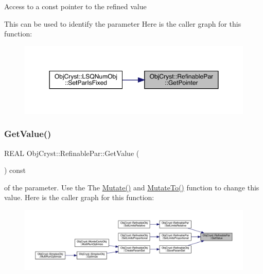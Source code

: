 Access to a const pointer to the refined value

This can be used to identify the parameter Here is the caller graph for this function\+:
\nopagebreak
\begin{figure}[H]
\begin{center}
\leavevmode
\includegraphics[width=350pt]{class_obj_cryst_1_1_refinable_par_a675b8d257ac8e88efd2eb47cd478ad99_icgraph}
\end{center}
\end{figure}
\mbox{\label{class_obj_cryst_1_1_refinable_par_a477cf548ff273fa1487b74a2c47af664}} 
\subsubsection{\texorpdfstring{GetValue()}{GetValue()}}
{\footnotesize\ttfamily R\+E\+AL Obj\+Cryst\+::\+Refinable\+Par\+::\+Get\+Value (\begin{DoxyParamCaption}{ }\end{DoxyParamCaption}) const}

of the parameter. Use the The \mbox{\hyperlink{class_obj_cryst_1_1_refinable_par_abd6a06bbb5eb59d80515ebdad2612da8}{Mutate()}} and \mbox{\hyperlink{class_obj_cryst_1_1_refinable_par_a696f87a0a129cfd270144532d664d093}{Mutate\+To()}} function to change this value. Here is the caller graph for this function\+:
\nopagebreak
\begin{figure}[H]
\begin{center}
\leavevmode
\includegraphics[width=350pt]{class_obj_cryst_1_1_refinable_par_a477cf548ff273fa1487b74a2c47af664_icgraph}
\end{center}
\end{figure}
\mbox{\label{class_obj_cryst_1_1_refinable_par_a58cbd1b3c3ada8383ddb444f879a9495}} 

